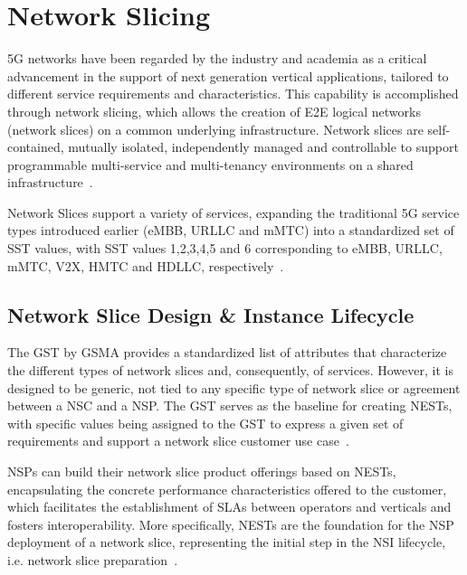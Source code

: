 \section{Network Slicing} \label{sota:slicing}

\acs{5G} networks have been regarded by the industry and academia as a critical advancement in the support of next generation vertical applications, tailored to different service requirements and characteristics. This capability is accomplished through network slicing, which allows the creation of \acs{E2E} logical networks (network slices) on a common underlying infrastructure. Network slices are  self-contained, mutually isolated, independently managed and controllable to support programmable multi-service and multi-tenancy environments on a shared infrastructure~\cite{slicingUsingSdnNfvTaxonomy}.

Network Slices support a variety of services, expanding the traditional \acs{5G} service types introduced earlier (\acs{eMBB}, \acs{URLLC} and \acs{mMTC}) into a standardized set of \acf{SST} values, with \acs{SST} values 1,2,3,4,5 and 6 corresponding to \acs{eMBB}, \acs{URLLC}, \acs{mMTC}, \acf{V2X}, \acf{HMTC} and \acf{HDLLC}, respectively~\cite{ETSI_TS_123_501_V16_9_0}. 

\subsection{Network Slice Design \& Instance Lifecycle} \label{sec:slice:lifecycle}

The \acf{GST} by \acs{GSMA} provides a standardized list of attributes that characterize the different types of network slices and, consequently, of services. However, it is designed to be generic, not tied to any specific type of network slice or agreement between a \acf{NSC} and a \acf{NSP}. The \acs{GST} serves as the baseline for creating \acfp{NEST}, with specific values being assigned to the \acs{GST} to express a given set of requirements and support a network slice customer use case~\cite{GSMA_GST}. 

\acsp{NSP} can build their network slice product offerings based on \acsp{NEST}, encapsulating the concrete performance characteristics offered to the customer, which facilitates the establishment of \acfp{SLA} between operators and verticals and fosters interoperability. More specifically, \acsp{NEST} are the foundation for the \acs{NSP} deployment of a network slice, representing the initial step in the \acf{NSI} lifecycle, i.e. network slice preparation~\cite{GSMA_GST}.

